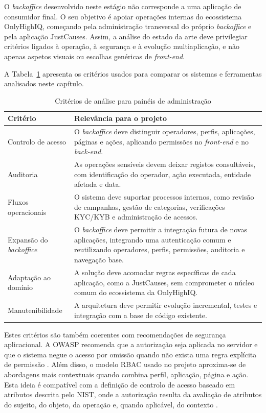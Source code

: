 O \textit{backoffice} desenvolvido neste estágio não corresponde a uma aplicação de consumidor final. O seu objetivo é apoiar operações internas do ecossistema OnlyHighIQ, começando pela administração transversal do próprio \textit{backoffice} e pela aplicação JustCauses. Assim, a análise do estado da arte deve privilegiar critérios ligados à operação, à segurança e à evolução multiaplicação, e não apenas aspetos visuais ou escolhas genéricas de \textit{front-end}.

A Tabela~\ref{tab:criterios_backoffice} apresenta os critérios usados para comparar os sistemas e ferramentas analisados neste capítulo.

\begin{table}[H]
\caption{Critérios de análise para painéis de administração}
\label{tab:criterios_backoffice}
\begin{center}
\small
\begin{tabular}{|p{3.4cm}|p{9.2cm}|}
\hline
\textbf{Critério} & \textbf{Relevância para o projeto} \\ \hline
Controlo de acesso & O \textit{backoffice} deve distinguir operadores, perfis, aplicações, páginas e ações, aplicando permissões no \textit{front-end} e no \textit{back-end}. \\ \hline
Auditoria & As operações sensíveis devem deixar registos consultáveis, com identificação do operador, ação executada, entidade afetada e data. \\ \hline
Fluxos operacionais & O sistema deve suportar processos internos, como revisão de campanhas, gestão de categorias, verificações \gls{KYC}/\gls{KYB} e administração de acessos. \\ \hline
Expansão do \textit{backoffice} & O \textit{backoffice} deve permitir a integração futura de novas aplicações, integrando uma autenticação comum e reutilizando operadores, perfis, permissões, auditoria e navegação base. \\ \hline
Adaptação ao domínio & A solução deve acomodar regras específicas de cada aplicação, como a JustCauses, sem comprometer o núcleo comum do ecossistema da OnlyHighIQ. \\ \hline
Manutenibilidade & A arquitetura deve permitir evolução incremental, testes e integração com a base de código existente. \\ \hline
\end{tabular}
\end{center}
\end{table}

Estes critérios são também coerentes com recomendações de segurança aplicacional. A OWASP recomenda que a autorização seja aplicada no servidor e que o sistema negue o acesso por omissão quando não exista uma regra explícita de permissão \cite{OWASPAuthorizationCheatSheet}. Além disso, o modelo \gls{RBAC} usado no projeto aproxima-se de abordagens mais contextuais quando combina perfil, aplicação, página e ação. Esta ideia é compatível com a definição de controlo de acesso baseado em atributos descrita pelo NIST, onde a autorização resulta da avaliação de atributos do sujeito, do objeto, da operação e, quando aplicável, do contexto \cite{NISTABAC}.

